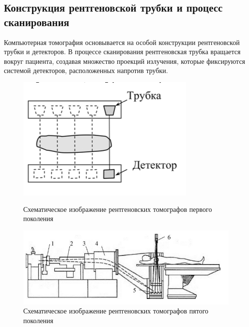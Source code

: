 \subsection{Конструкция рентгеновской трубки и процесс сканирования}

Компьютерная томография основывается на особой конструкции рентгеновской трубки и детекторов. В процессе сканирования рентгеновская трубка вращается вокруг пациента, создавая множество проекций излучения, которые фиксируются системой детекторов, расположенных напротив трубки. 
\begin{figure}[H]
    \centering
    \begin{minipage}{0.25\textwidth}
        \centering
        \includegraphics[width=\linewidth]{pic/1.png}
        \caption{Схематическое изображение рентгеновских томографов первого поколения}
        \label{fig:image1}
    \end{minipage}
    \begin{minipage}{0.35\textwidth}
        \centering
        \includegraphics[width=\linewidth]{pic/2.png}
        \caption{Схематическое изображение рентгеновских томографов пятого поколения}
        \label{fig:image2}
    \end{minipage}
\end{figure}

